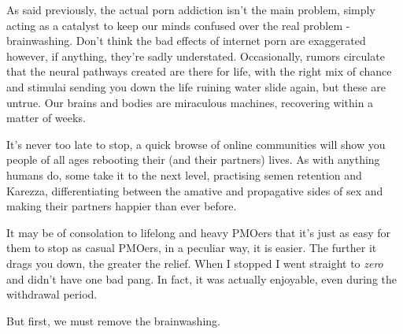 \documentclass[easypeasy.tex]{subfiles}
\begin{document}
As said previously, the actual porn addiction isn't the main problem, simply acting as a catalyst to keep our minds confused over the real problem - brainwashing. Don't think the bad effects of internet porn are exaggerated however, if anything, they're sadly understated. Occasionally, rumors circulate that the neural pathways created are there for life, with the right mix of chance and stimulai sending you down the life ruining water slide again, but these are untrue. Our brains and bodies are miraculous machines, recovering within a matter of weeks.

It's never too late to stop, a quick browse of online communities will show you people of all ages rebooting their (and their partners) lives. As with anything humans do, some take it to the next level, practising semen retention and Karezza, differentiating between the amative and propagative sides of sex and making their partners happier than ever before.

It may be of consolation to lifelong and heavy PMOers that it's just as easy for them to stop as casual PMOers, in a peculiar way, it is easier. The further it drags you down, the greater the relief. When I stopped I went straight to \textit{zero} and didn't have one bad pang. In fact, it was actually enjoyable, even during the withdrawal period.

But first, we must remove the brainwashing.
\end{document}
